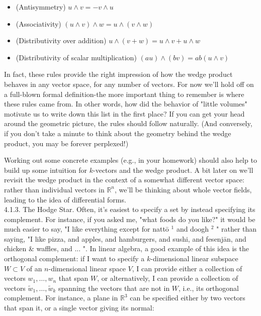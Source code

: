 \documentclass[10pt]{article}
\begin{document}
\begin{itemize}
  \item[-] (Antisymmetry) $u \wedge v=-v \wedge u$
  \item[-] (Associativity) $(u \wedge v) \wedge w=u \wedge(v \wedge w)$
  \item[-] (Distributivity over addition) $u \wedge(v+w)=u \wedge v+u \wedge w$
  \item[-] (Distributivity of scalar multiplication) $(a u) \wedge(b v)=a b(u \wedge v)$
\end{itemize}

In fact, these rules provide the right impression of how the wedge product behaves in any vector space, for any number of vectors. For now we'll hold off on a full-blown formal definition-the more important thing to remember is where these rules came from. In other words, how did the behavior of "little volumes" motivate us to write down this list in the first place? If you can get your head around the geometric picture, the rules should follow naturally. (And conversely, if you don't take a minute to think about the geometry behind the wedge product, you may be forever perplexed!)

Working out some concrete examples (e.g., in your homework) should also help to build up some intuition for $k$-vectors and the wedge product. A bit later on we'll revisit the wedge product in the context of a somewhat different vector space: rather than individual vectors in $\mathbb{R}^{n}$, we'll be thinking about whole vector fields, leading to the idea of differential forms.\\
4.1.3. The Hodge Star. Often, it's easiest to specify a set by instead specifying its complement. For instance, if you asked me, "what foods do you like?" it would be much easier to say, "I like everything except for nattō ${ }^{1}$ and doogh ${ }^{2}$ " rather than saying, "I like pizza, and apples, and hamburgers, and sushi, and fesenjān, and chicken \& waffles, and ... ". In linear algebra, a good example of this idea is the orthogonal complement: if I want to specify a $k$-dimensional linear subspace $W \subset V$ of an $n$-dimensional linear space $V$, I can provide either a collection of vectors $w_{1}, \ldots, w_{n}$ that span $W$, or alternatively, I can provide a collection of vectors $\tilde{w}_{1}, \ldots, \tilde{w}_{k}$ spanning the vectors that are not in $W$, i.e., its orthogonal complement. For instance, a plane in $\mathbb{R}^{3}$ can be specified either by two vectors that span it, or a single vector giving its normal:
\end{document}
